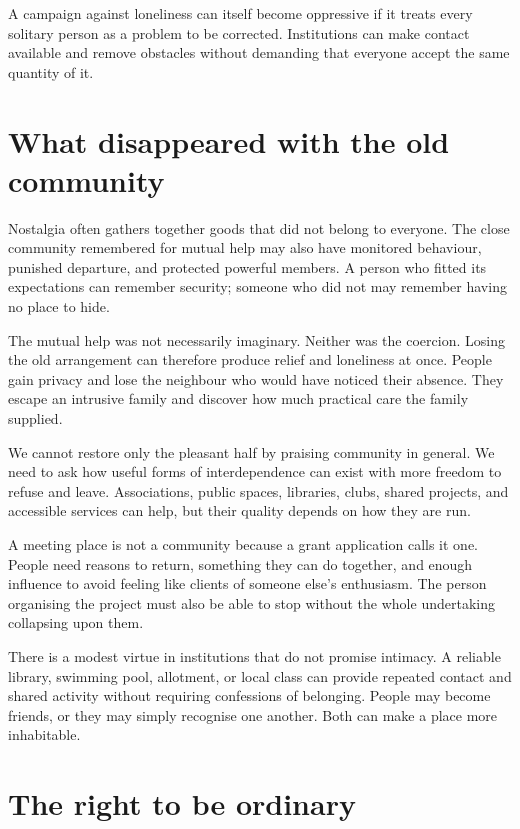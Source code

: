 \documentclass[12pt,a4paper]{book}
\begin{document}
A campaign against loneliness can itself become oppressive if it treats every solitary person as a problem to be corrected. Institutions can make contact available and remove obstacles without demanding that everyone accept the same quantity of it.

\section*{What disappeared with the old community}

Nostalgia often gathers together goods that did not belong to everyone. The close community remembered for mutual help may also have monitored behaviour, punished departure, and protected powerful members. A person who fitted its expectations can remember security; someone who did not may remember having no place to hide.

The mutual help was not necessarily imaginary. Neither was the coercion. Losing the old arrangement can therefore produce relief and loneliness at once. People gain privacy and lose the neighbour who would have noticed their absence. They escape an intrusive family and discover how much practical care the family supplied.

We cannot restore only the pleasant half by praising community in general. We need to ask how useful forms of interdependence can exist with more freedom to refuse and leave. Associations, public spaces, libraries, clubs, shared projects, and accessible services can help, but their quality depends on how they are run.

A meeting place is not a community because a grant application calls it one. People need reasons to return, something they can do together, and enough influence to avoid feeling like clients of someone else's enthusiasm. The person organising the project must also be able to stop without the whole undertaking collapsing upon them.

There is a modest virtue in institutions that do not promise intimacy. A reliable library, swimming pool, allotment, or local class can provide repeated contact and shared activity without requiring confessions of belonging. People may become friends, or they may simply recognise one another. Both can make a place more inhabitable.

\section*{The right to be ordinary}
\end{document}
